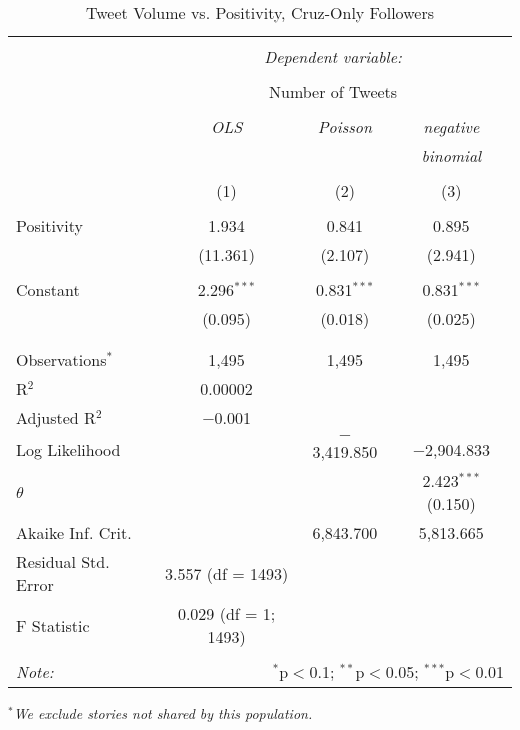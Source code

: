 \begin{table}[!htbp] \centering 
  \caption{Tweet Volume vs. Positivity, Cruz-Only Followers} 
  \label{} 
    \begin{tabular}{@{\extracolsep{5pt}}lccc} 
    \\[-1.8ex]\hline 
    \hline \\[-1.8ex] 
     & \multicolumn{3}{c}{\textit{Dependent variable:}} \\ 
    \cline{2-4} 
    \\[-1.8ex] & \multicolumn{3}{c}{Number of Tweets} \\ 
    \\[-1.8ex] & \textit{OLS} & \textit{Poisson} & \textit{negative} \\ 
     & \textit{} & \textit{} & \textit{binomial} \\ 
    \\[-1.8ex] & (1) & (2) & (3)\\ 
    \hline \\[-1.8ex] 
     Positivity & 1.934 & 0.841 & 0.895 \\ 
      & (11.361) & (2.107) & (2.941) \\ 
      & & & \\ 
     Constant & 2.296$^{***}$ & 0.831$^{***}$ & 0.831$^{***}$ \\ 
      & (0.095) & (0.018) & (0.025) \\ 
      & & & \\ 
    \hline \\[-1.8ex] 
    Observations$^{*}$ & 1,495 & 1,495 & 1,495 \\ 
    R$^{2}$ & 0.00002 &  &  \\ 
    Adjusted R$^{2}$ & $-$0.001 &  &  \\ 
    Log Likelihood &  & $-$3,419.850 & $-$2,904.833 \\ 
    $\theta$ &  &  & 2.423$^{***}$  (0.150) \\ 
    Akaike Inf. Crit. &  & 6,843.700 & 5,813.665 \\ 
    Residual Std. Error & 3.557 (df = 1493) &  &  \\ 
    F Statistic & 0.029 (df = 1; 1493) &  &  \\ 
    \hline 
    \hline \\[-1.8ex] 
    \textit{Note:}  & \multicolumn{3}{r}{$^{*}$p$<$0.1; $^{**}$p$<$0.05; $^{***}$p$<$0.01} \\ 
    \end{tabular} 
\end{table} 
\emph{$^{*}$We exclude stories not shared by this population.} 
\newpage 


\clearpage
\newpage 